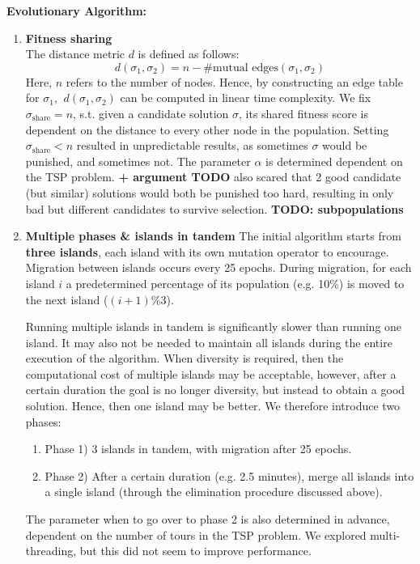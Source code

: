 \documentclass[a4paper,10pt]{article}
\begin{document}
	\textbf{Evolutionary Algorithm:}
	\begin{enumerate}
		\item \textbf{Fitness sharing} \\
		The distance metric $d$ is defined as follows: 
		$$d(\sigma_1, \sigma_2) = n - \# \text{mutual edges}(\sigma_1, \sigma_2)$$
		Here, $n$ refers to the number of nodes. Hence, by constructing an edge table for $\sigma_1$, $~d(\sigma_1, \sigma_2)$ can be computed in linear time complexity.
		We fix $\sigma_{\text{share}} = n$, s.t. given a candidate solution $\sigma$, its shared fitness score is dependent on the distance to every other node in the population. Setting $\sigma_{\text{share}} < n$ resulted in unpredictable results, as sometimes $\sigma$ would be punished, and sometimes not. The parameter $\alpha$ is determined dependent on the TSP problem.
		\textbf{+ argument TODO } also scared that 2 good candidate (but similar) solutions would both be punished too hard, resulting in only bad but different candidates to survive selection.
		\textbf{TODO: subpopulations}
		
		\item \textbf{Multiple phases \& islands in tandem}
		The initial algorithm starts from \textbf{three islands}, each island with its own mutation operator to encourage. Migration between islands occurs every 25 epochs. During migration, for each island $i$ a predetermined percentage of its population (e.g. 10\%) is moved to the next island ($(i+1) \%3$).
		
		Running multiple islands in tandem is significantly slower than running one island. It may also not be needed to maintain all islands during the entire execution of the algorithm. When diversity is required, then the computational cost of multiple islands may be acceptable, however, after a certain duration the goal is no longer diversity, but instead to obtain a good solution. Hence, then one island may be better. We therefore introduce two phases:
		\begin{enumerate}
			\item Phase 1) 3 islands in tandem, with migration after 25 epochs.
			\item Phase 2) After a certain duration (e.g. 2.5 minutes), merge all islands into a single island (through the elimination procedure discussed above).
		\end{enumerate}
		
		The parameter when to go over to phase 2 is also determined in advance, dependent on the number of tours in the TSP problem.  We explored multi-threading, but this did not seem to improve performance.
		 	
	
	\end{enumerate}
	
\end{document}
